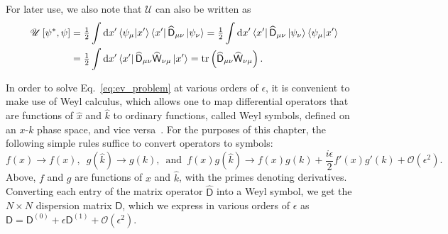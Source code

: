 For later use, we also note that $\mathscr{U}$ can also be written as
%
\begin{equation}
  \begin{aligned}
    \mathscr{U}\left[\psi^{*}, \psi\right] &= \tfrac{1}{2}\int \mathrm{d}{x}' \mathinner{\langle{\psi_{\mu}|x'}\rangle}\mathinner{\langle{x'}\rvert}\widehat{\mathsf{D}}_{\mu\nu}\mathinner{\lvert{\psi_{\nu}}\rangle}
= \tfrac{1}{2}\int \mathrm{d}{x}' \mathinner{\langle{x'}\rvert}\widehat{\mathsf{D}}_{\mu\nu}\mathinner{\lvert{\psi_{\nu}}\rangle} \mathinner{\langle{\psi_{\mu}|x'}\rangle}\\
&= \tfrac{1}{2}\int \mathrm{d}{x}' \mathinner{\langle{x'}\rvert}\widehat{\mathsf{D}}_{\mu\nu}\widehat{\mathsf{W}}_{\nu\mu}\mathinner{\lvert{x'}\rangle} = \operatorname{tr}\left(\widehat{\mathsf{D}}_{\mu\nu}\widehat{\mathsf{W}}_{\nu\mu}\right).
  \label{eq:wave_action_trace_form}
  \end{aligned}
\end{equation}
%

In order to solve Eq.~\eqref{eq:ev_problem} at various orders of $\epsilon$, it is convenient to make use of Weyl calculus, which allows one to map differential operators that are functions of $\hat{x}$ and $\hat{k}$ to ordinary functions, called Weyl symbols, defined on an $x$-$k$ phase space, and vice versa~\cite{chaichian2001,cohen2012}.
For the purposes of this chapter, the following simple rules suffice to convert operators to symbols:
%
\begin{equation}
  f(x) \to f(x),\enspace
  g(\hat{k}) \to g(k),\enspace\text{and}\enspace
  f(x)g(\hat{k}) \to f(x)g(k) + \frac{i\epsilon}{2}f'(x)g'(k) + \mathcal{O}(\epsilon^{2}).
  \label{eq:weylrules}
\end{equation}
%
Above, $f$ and $g$ are functions of $x$ and $\hat{k}$, with the primes denoting derivatives.
Converting each entry of the matrix operator $\widehat{\mathsf{D}}$ into a Weyl symbol, we get the $N\times N$ dispersion matrix $\mathsf{D}$, which we express in various orders of $\epsilon$ as $\mathsf{D} = \mathsf{D}^{(0)} + \epsilon\mathsf{D}^{(1)} + \mathcal{O}(\epsilon^{2})$.

